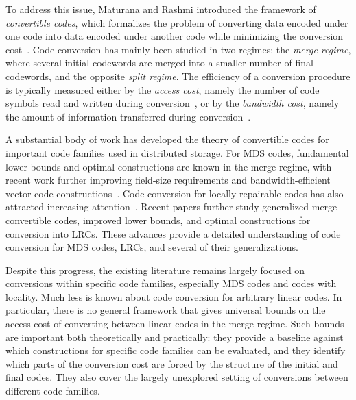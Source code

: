 \documentclass[conference, 10pt]{IEEEtran}
\theoremstyle{plain}
\theoremstyle{definition}
\begin{document}
To address this issue, Maturana and Rashmi introduced the framework of \emph{convertible codes}, which formalizes the problem of converting data encoded under one code into data encoded under another code while minimizing the conversion cost~\cite{maturana2022convertible}. Code conversion has mainly been studied in two regimes: the \emph{merge regime}, where several initial codewords are merged into a smaller number of final codewords, and the opposite \emph{split regime}. The efficiency of a conversion procedure is typically measured either by the \emph{access cost}, namely the number of code symbols read and written during conversion~\cite{maturana2022convertible}, or by the \emph{bandwidth cost}, namely the amount of information transferred during conversion~\cite{maturana2023bandwidth}.

A substantial body of work has developed the theory of convertible codes for important code families used in distributed storage. For MDS codes, fundamental lower bounds and optimal constructions are known in the merge regime, with recent work further improving field-size requirements and bandwidth-efficient vector-code constructions~\cite{maturana2020access, maturana2023bandwidth, ramkumar2025mds, chopra2024low}. Code conversion for locally repairable codes has also attracted increasing attention~\cite{shi2025bounds, ge2025locally, kong2024locally}. Recent papers further study generalized merge-convertible codes, improved lower bounds, and optimal constructions for conversion into LRCs. These advances provide a detailed understanding of code conversion for MDS codes, LRCs, and several of their generalizations.

Despite this progress, the existing literature remains largely focused on conversions within specific code families, especially MDS codes and codes with locality. Much less is known about code conversion for arbitrary linear codes. In particular, there is no general framework that gives universal bounds on the access cost of converting between linear codes in the merge regime. Such bounds are important both theoretically and practically: they provide a baseline against which constructions for specific code families can be evaluated, and they identify which parts of the conversion cost are forced by the structure of the initial and final codes. They also cover the largely unexplored setting of conversions between different code families.
\end{document}
